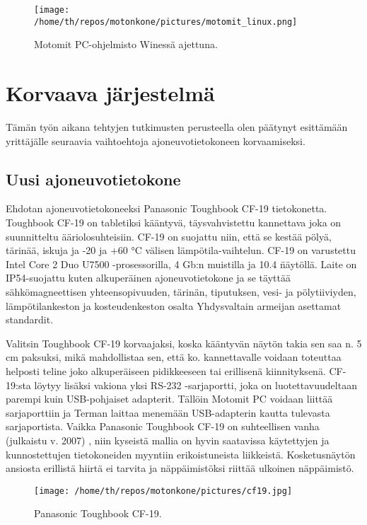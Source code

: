 \documentclass[11pt,a4paper,oneside,article]{memoir}
\begin{document}
\begin{figure}[H]
\centering
\texttt{[image: /home/th/repos/motonkone/pictures/motomit\_linux.png]}
\caption{Motomit PC-ohjelmisto Winessä ajettuna.}
\end{figure}

\newpage

\chapter{Korvaava järjestelmä}
\label{ch:korvaava_jarjestelma}

Tämän työn aikana tehtyjen tutkimusten perusteella olen päätynyt esittämään yrittäjälle seuraavia vaihtoehtoja ajoneuvotietokoneen korvaamiseksi.

\section{Uusi ajoneuvotietokone}

Ehdotan ajoneuvotietokoneeksi Panasonic Toughbook CF-19 tietokonetta. Toughbook CF-19 on tabletiksi kääntyvä, täysvahvistettu kannettava joka on suunnitteltu ääriolosuhteisiin. CF-19 on suojattu niin, että se kestää pölyä, tärinää, iskuja ja -20 ja +60 °C välisen lämpötila-vaihtelun. CF-19 on varustettu Intel Core 2 Duo U7500 -prosessorilla, 4 Gb:n muistilla ja 10.4 \" näytöllä. Laite on IP54-suojattu kuten alkuperäinen ajoneuvotietokone ja se täyttää sähkömagneettisen yhteensopivuuden, tärinän, tiputuksen, vesi- ja pölytiiviyden, lämpötilankeston ja kosteudenkeston osalta Yhdysvaltain armeijan asettamat standardit. \cite{cf19}

Valitsin Toughbook CF-19 korvaajaksi, koska kääntyvän näytön takia sen saa n. 5 cm paksuksi, mikä mahdollistaa sen, että ko. kannettavalle voidaan toteuttaa helposti teline joko alkuperäiseen pidikkeeseen tai erillisenä kiinnityksenä. CF-19:sta löytyy lisäksi vakiona yksi RS-232 -sarjaportti, joka on luotettavuudeltaan parempi kuin USB-pohjaiset adapterit. Tällöin Motomit PC voidaan liittää sarjaporttiin ja Terman laittaa menemään USB-adapterin kautta tulevasta sarjaportista. Vaikka Panasonic Toughbook CF-19 on suhteellisen vanha (julkaistu v. 2007) \cite{cf19}, niin kyseistä mallia on hyvin saatavissa käytettyjen ja kunnostettujen tietokoneiden myyntiin erikoistuneista liikkeistä. Kosketusnäytön ansiosta erillistä hiirtä ei tarvita ja näppäimistöksi riittää ulkoinen näppäimistö.

\lipsum[1-5]

\begin{figure}[H]
\centering
\texttt{[image: /home/th/repos/motonkone/pictures/cf19.jpg]}
\caption{Panasonic Toughbook CF-19.}
\end{figure}
\end{document}
